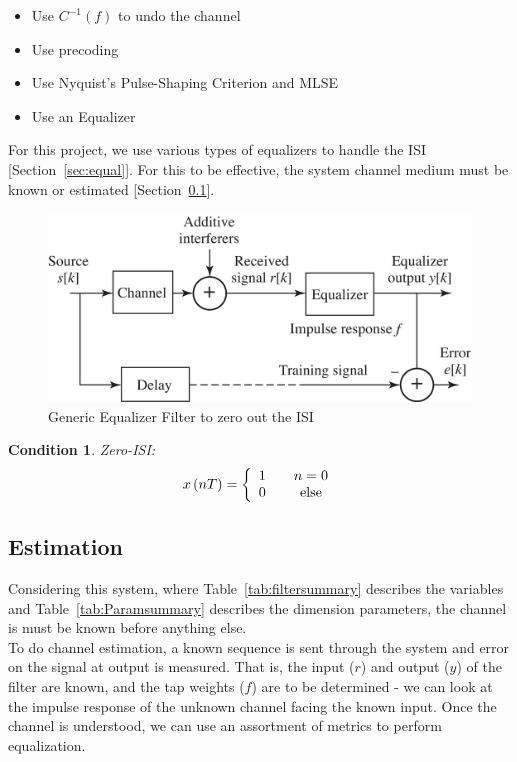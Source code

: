 \documentclass[]{article}
\newtheorem{thm}{Condition}
\begin{document}
\begin{itemize}
\item Use $C^{-1}\left(f\right)$ to undo the channel
\item Use precoding
\item Use Nyquist's Pulse-Shaping Criterion and MLSE
\item Use an Equalizer
\end{itemize}
For this project, we use various types of equalizers to handle the ISI [Section~\ref{sec:equal}].  For this to be effective, the system channel medium must be known or estimated [Section~\ref{sec:estimate}].\\

\begin{figure}[b]
\centering
\includegraphics[width=.6\textwidth]{equalizer.png}
\caption{Generic Equalizer Filter to zero out the ISI\label{fig:equalizer}}
\end{figure}

\begin{thm}
\label{thm:zero}
Zero-ISI:
$$x\left(nT\right) = \left\{
\begin{array}{c c}
1 & \quad n=0 \\
0 & \quad \text{else}
\end{array} \right.$$
\end{thm}

\subsection{Estimation}
\label{sec:estimate}
Considering this system, where Table~\ref{tab:filtersummary} describes the variables and Table~\ref{tab:Paramsummary} describes the dimension parameters, the channel is must be known before anything else. \\

To do channel estimation, a known sequence is sent through the system and error on the signal at output is measured.  That is, the input ($r$) and output ($y$) of the filter are known, and the tap weights ($f$) are to be determined - we can look at the impulse response of the unknown channel facing the known input.  Once the channel is understood, we can use an assortment of metrics to perform equalization.
\end{document}
